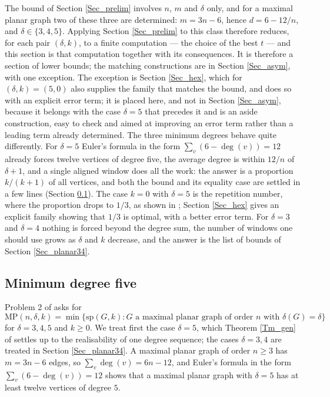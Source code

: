 \documentclass[10pt,a4paper]{article}
\begin{document}
The bound of Section \ref{Sec_prelim} involves $n$, $m$ and $\delta $ only, and
for a maximal planar graph two of these three are determined: $m=3n-6$,
hence $d=6-12/n$, and $\delta \in \{3,4,5\}$. Applying Section \ref{Sec_prelim}
to this class therefore reduces, for each pair $(\delta ,k)$, to a finite
computation --- the choice of the best $t$ --- and this section is that
computation together with its consequences. It is therefore a section of lower bounds; the matching
constructions are in Section \ref{Sec_asym}, with one exception. The exception is Section \ref{Sec_hex},
which for $(\delta ,k)=(5,0)$ also supplies the family that matches the bound, and does so with an explicit
error term; it is placed here,
and not in Section \ref{Sec_asym}, because it belongs with the case $\delta =5$ that precedes it and
is an aside construction, easy to check and aimed at improving an error term rather than a leading term
already determined. The three minimum degrees behave quite differently. For $\delta =5$ Euler's formula in the form
$\sum_{v}(6-\deg (v))=12$ already forces twelve vertices of degree five, the
average degree is within $12/n$ of $\delta +1$, and a single aligned window does
all the work: the answer is a proportion $k/(k+1)$ of all vertices, and both the
bound and its equality case are settled in a few lines (Section
\ref{Sec_planar5}). The case $k=0$ with $\delta =5$ is the repetition number,
where the proportion drops to $1/3$, as shown in \cite{CaroWest}; Section \ref{Sec_hex} gives an explicit
family showing that $1/3$ is optimal, with a better error term. For $\delta =3$ and $\delta =4$ nothing
is forced beyond the degree sum, the number of windows one should use grows as
$\delta $ and $k$ decrease, and the answer is the list of bounds of Section
\ref{Sec_planar34}.



\subsection{Minimum degree five}
\label{Sec_planar5}

Problem 2 of \cite{CaroLauriZarb} asks for
\[
\mathrm{MP}(n,\delta ,k)=\min \{\mathrm{sp}(G,k):G\text{ a maximal planar graph of order }n%
\text{ with }\delta (G)=\delta \}
\]
for $\delta =3,4,5$ and $k\geq 0$. We treat first the case $\delta =5$, which Theorem
\ref{Tm_gen} of \cite{P1} settles up to the realisability of one degree sequence; the cases $\delta =3,4$ are
treated in Section \ref{Sec_planar34}. A maximal planar graph of
order $n\geq 3$ has $m=3n-6$ edges, so $\sum_{v}\deg (v)=6n-12$, and Euler's formula in the form
$\sum_{v}(6-\deg (v))=12$ shows that a maximal planar graph with $\delta =5$ has at least twelve
vertices of degree $5$.
\end{document}
